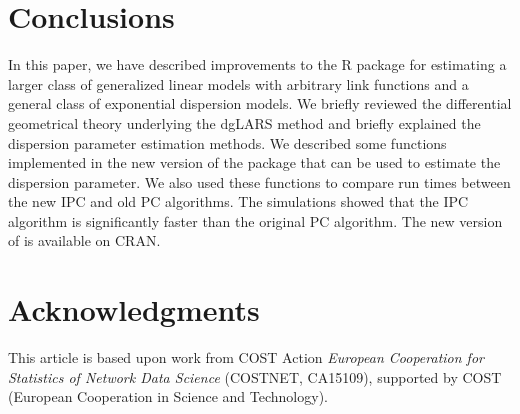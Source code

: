 \section[Conclusions]{Conclusions}
\label{sec:conclu}


In this paper, we have described improvements to the {R} package  for estimating a larger class of generalized linear models with arbitrary link functions and a general class of exponential dispersion models. 
We briefly reviewed the differential geometrical theory underlying the dgLARS method and briefly explained the dispersion parameter estimation methods. We described some functions implemented in the new version of the  package that can be used to estimate the dispersion parameter. We also used these functions to compare run times between the new IPC and old PC algorithms. 
The simulations showed that the IPC algorithm is significantly faster than the original PC algorithm. The new version of  is available on CRAN.

\section*{Acknowledgments}
This article is based upon work from COST Action \emph{European Cooperation for Statistics of Network Data Science} (COSTNET, CA15109), supported by COST
(European Cooperation in Science and Technology).












\address{Hassan Pazira\\
	Epidemiology and Biostatistics\\
	VU University Medical Center\\
	De Boelelaan 1117, 1081 HV Amsterdam, The Netherlands\\
	}

\address{Luigi Augugliaro\\
	Department of Economics, Business and Statistics\\
	University of Palermo\\
	90128 Palermo, Italy\\
	}

\address{Ernst C. Wit \\
	Institute of Computational Science\\
	Universit\`a della Svizzera italiana (USI)\\
	Via G. Buffi 13, 6900 Lugano, Switzerland\\
	}
